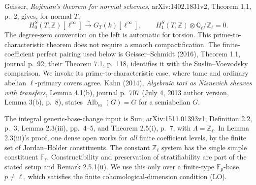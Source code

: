 Geisser, \emph{Rojtman's theorem for normal schemes},
arXiv:1402.1831v2, Theorem 1.1, p.~2, gives, for normal $T$,
\[
 H_0^S(T,\mathbb Z)[\ell^\infty]
       \xrightarrow{\sim}G_T(k)[\ell^\infty],\qquad
 H_1^S(T,\mathbb Z)\otimes\mathbb Q_\ell/\mathbb Z_\ell=0.
                                                               \tag{AQ.14.3}
\]
The degree-zero convention on the left is automatic for
torsion. This prime-to-characteristic theorem does not
require a smooth compactification. The finite-coefficient
perfect pairing used below is Geisser--Schmidt (2016),
Theorem 1.1, journal p.~92; their Theorem 7.1, p.~118, identifies it
with the Suslin--Voevodsky comparison. We invoke its
prime-to-characteristic case, where tame and ordinary
abelian $\ell$-primary covers agree. Kahn (2014),
\emph{Algebraic tori as Nisnevich sheaves with transfers},
Lemma 4.1(b), journal p.~707 (July 4, 2013 author version,
Lemma 3(b), p.~8), states
$\operatorname{Alb}_{\mathrm{sa}}(G)=G$ for a semiabelian $G$.

The integral generic-base-change input is Sun,
arXiv:1511.01393v1, Definition 2.2, p.~3, Lemma 2.3(iii),
pp.~4--5, and Theorem 2.5(i), p.~7, with
$\Lambda=\mathbb Z_\ell$. In Lemma 2.3(iii)'s proof, one
dense open works for \emph{all} finite coefficient levels,
by the finite set of Jordan--H\"older constituents. The
constant $\mathbb Z_\ell$ system has the single simple
constituent $\mathbb F_\ell$. Constructibility and preservation
of stratifiability are part of the stated setup and
Remark 2.5.1(ii). We use this only over a finite-type
$\mathbb F_p$-base, $p\ne\ell$, which satisfies the finite
cohomological-dimension condition (LO).

